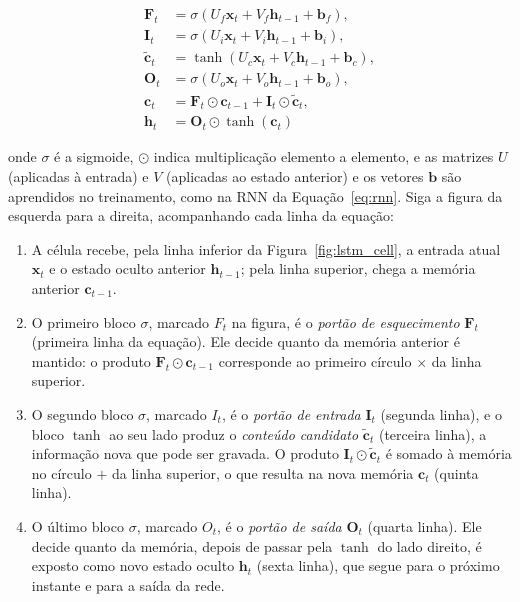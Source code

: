 \begin{equation}
\begin{aligned}
    \mathbf{F}_t &= \sigma(U_f\mathbf{x}_t + V_f\mathbf{h}_{t-1} + \mathbf{b}_f),\\
    \mathbf{I}_t &= \sigma(U_i\mathbf{x}_t + V_i\mathbf{h}_{t-1} + \mathbf{b}_i),\\
    \tilde{\mathbf{c}}_t &= \tanh(U_c\mathbf{x}_t + V_c\mathbf{h}_{t-1} + \mathbf{b}_c),\\
    \mathbf{O}_t &= \sigma(U_o\mathbf{x}_t + V_o\mathbf{h}_{t-1} + \mathbf{b}_o),\\
    \mathbf{c}_t &= \mathbf{F}_t \odot \mathbf{c}_{t-1} + \mathbf{I}_t \odot \tilde{\mathbf{c}}_t,\\
    \mathbf{h}_t &= \mathbf{O}_t \odot \tanh(\mathbf{c}_t)
\end{aligned}
\label{eq:lstm}
\end{equation}

\noindent onde \(\sigma\) é a sigmoide, \(\odot\) indica multiplicação elemento a elemento, e as matrizes \(U\) (aplicadas à entrada) e \(V\) (aplicadas ao estado anterior) e os vetores \(\mathbf{b}\) são aprendidos no treinamento, como na RNN da Equação~\ref{eq:rnn}. Siga a figura da esquerda para a direita, acompanhando cada linha da equação:

\begin{enumerate}
    \item A célula recebe, pela linha inferior da Figura~\ref{fig:lstm_cell}, a entrada atual \(\mathbf{x}_t\) e o estado oculto anterior \(\mathbf{h}_{t-1}\); pela linha superior, chega a memória anterior \(\mathbf{c}_{t-1}\).
    \item O primeiro bloco \(\sigma\), marcado \(F_t\) na figura, é o \emph{portão de esquecimento} \(\mathbf{F}_t\) (primeira linha da equação). Ele decide quanto da memória anterior é mantido: o produto \(\mathbf{F}_t\odot\mathbf{c}_{t-1}\) corresponde ao primeiro círculo \(\times\) da linha superior.
    \item O segundo bloco \(\sigma\), marcado \(I_t\), é o \emph{portão de entrada} \(\mathbf{I}_t\) (segunda linha), e o bloco \(\tanh\) ao seu lado produz o \emph{conteúdo candidato} \(\tilde{\mathbf{c}}_t\) (terceira linha), a informação nova que pode ser gravada. O produto \(\mathbf{I}_t\odot\tilde{\mathbf{c}}_t\) é somado à memória no círculo \(+\) da linha superior, o que resulta na nova memória \(\mathbf{c}_t\) (quinta linha).
    \item O último bloco \(\sigma\), marcado \(O_t\), é o \emph{portão de saída} \(\mathbf{O}_t\) (quarta linha). Ele decide quanto da memória, depois de passar pela \(\tanh\) do lado direito, é exposto como novo estado oculto \(\mathbf{h}_t\) (sexta linha), que segue para o próximo instante e para a saída da rede.
\end{enumerate}

